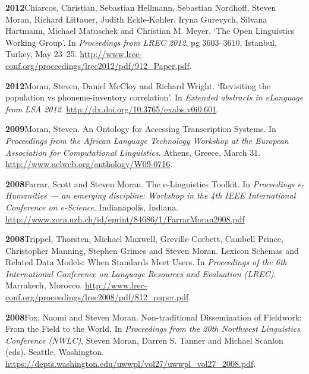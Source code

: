 \documentclass[11pt]{article}
\newcommand{\hangpara}{
 \setlength{\parindent}{0in} %
 \hangindent=0.42in %
}
\begin{document}

\vskip 6pt
\hangpara
{\bf 2012}\hspace{1ex}Chiarcos, Christian, Sebastian Hellmann, Sebastian Nordhoff, Steven Moran, Richard Littauer, Judith Eckle-Kohler, Iryna Gurevych, Silvana Hartmann, Michael Matuschek and Christian M. Meyer.  `The Open Linguistics Working Group'. In {\it Proceedings from LREC 2012}, pg 3603--3610, Istanbul, Turkey, May 23--25. \url{http://www.lrec-conf.org/proceedings/lrec2012/pdf/912_Paper.pdf}.

\vskip 6pt
\hangpara
{\bf 2012}\hspace{1ex}Moran, Steven, Daniel McCloy and Richard Wright. `Revisiting the population vs phoneme-inventory correlation'. In {\it Extended abstracts in eLanguage from LSA 2012}. \url{http://dx.doi.org/10.3765/exabs.v0i0.601}.

\vskip 6pt
\hangpara
{\bf 2009}\hspace{1ex}Moran, Steven. An Ontology for Accessing Transcription Systems. In {\it Proceedings from the African Language Technology Workshop at the European Association for Computational Linguistics}. Athens, Greece, March 31. \url{http://www.aclweb.org/anthology/W09-0716}. %

\vskip 6pt
\hangpara
{\bf 2008}\hspace{1ex}Farrar, Scott and Steven Moran. The e-Linguistics Toolkit. In {\it Proceedings e-Humanities --- an emerging discipline: Workshop in the 4th IEEE International Conference on e-Science}. Indianapolis, Indiana. \url{http://www.zora.uzh.ch/id/eprint/84686/1/FarrarMoran2008.pdf}

\vskip 6pt
\hangpara
{\bf 2008}\hspace{1ex}Trippel, Thorsten, Michael Maxwell, Greville Corbett, Cambell Prince, Christopher Manning, Stephen Grimes and Steven Moran. Lexicon Schemas and Related Data Models: When Standards Meet Users. In {\it Proceedings of the 6th International Conference on Language Resources and Evaluation (LREC)}. Marrakech, Morocco. \url{http://www.lrec-conf.org/proceedings/lrec2008/pdf/812_paper.pdf}.

\vskip 6pt
\hangpara
{\bf 2008}\hspace{1ex}Fox, Naomi and Steven Moran. Non-traditional Dissemination of Fieldwork: From the Field to the World. In {\it Proceedings from the 20th Northwest Linguistics Conference (NWLC)}, Steven Moran, Darren S. Tanner and Michael Scanlon (eds). Seattle, Washington. \url{https://depts.washington.edu/uwwpl/vol27/uwwpl_vol27_2008.pdf}. %
\end{document}
